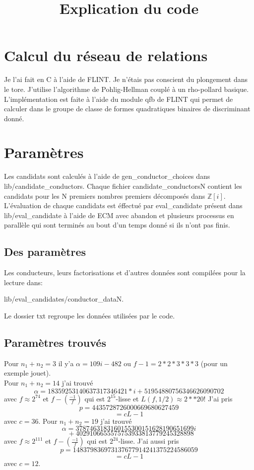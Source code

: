 \documentclass[12pt]{article}
\theoremstyle{plain}
\theoremstyle{definition}
\newcommand{\Z}{\mathbb{Z}}
\begin{document}
\title{Explication du code}
\maketitle

\section{Calcul du réseau de relations}
Je l'ai fait en C à l'aide de FLINT. Je n'étais pas conscient du plongement dans le tore.
J'utilise l'algorithme de Pohlig-Hellman couplé à un rho-pollard basique. L'implémentation 
est faite à l'aide du module qfb de FLINT qui permet de calculer dans le groupe de classe de 
formes quadratiques binaires de discriminant donné.

\section{Paramètres}
Les candidats sont calculés à l'aide de 
gen\_conductor\_choices dans lib/candidate\_conductors. Chaque 
fichier candidate\_conductorsN contient les 
candidats pour les N premiers nombres 
premiers décomposés dans $\Z[i]$. L'évaluation 
de chaque candidats est éffectué par 
eval\_candidate présent dans lib/eval\_candidate
à l'aide de ECM avec abandon et plusieurs processus 
en parallèle qui sont terminés au bout d'un temps donné 
si ils n'ont pas finis. 

\subsection{Des paramètres}
Les conducteurs, leurs factorisations et d'autres données sont compilées pour la lecture dans:
\begin{center}
  lib/eval\_candidates/conductor\_dataN.
\end{center}
Le dossier txt regroupe les données utilisées par le code.
\subsection{Paramètres trouvés}
Pour $n_1+n_2=3$ il y'a $\alpha=109i-482$ ou $f-1=2*2*3*3*3$ (pour un exemple jouet).\\
Pour $n_1+n_2=14$ j'ai trouvé
\[\alpha=18359253140637317346421*i+51954880756346626090702\]
avec $f\approx 2^{74}$ et $f- (\frac{-1}{f})$ 
qui est $2^{15}$-lisse et $L(f,1/2)\approx 2**20$! J'ai pris
\[p=
4435728726000669680627459
\]\[=cL-1\]
 avec $c=36$.
Pour $n_1+n_2=19$ j'ai trouvé
\[\alpha=3787463183160155300151628190651699i
\]
\[~~+4029106655575753933813779245328898
\]
avec $f\approx 2^{111}$ et $f-(\frac{-1}{f})$
qui est $2^{24}$-lisse. J'ai aussi pris \[
    p= 148379836973137677914241375224586059
    \]
\[=cL-1\] avec $c=12$.
\end{document}
